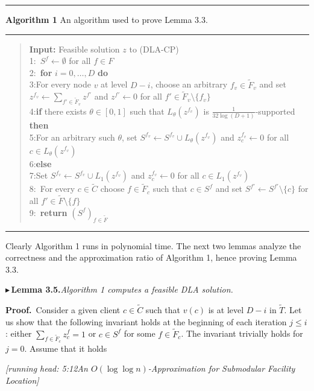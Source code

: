 \documentclass[11pt]{article}
\newcommand{\tF}{\tilde F}
\newcommand{\tC}{\tilde C}
\newcommand{\tT}{\tilde T}
\newcommand{\pitem}[2]{\par\medskip\noindent$\blacktriangleright$\,\textbf{#1}\;\textit{#2}\par\medskip}
\begin{document}
\bigskip
\noindent\rule{\textwidth}{0.4pt}
\noindent\textbf{Algorithm 1} An algorithm used to prove Lemma 3.3.
\noindent\rule{\textwidth}{0.4pt}
\begin{quote}
\textbf{Input:} Feasible solution $z$ to (DLA-CP)\\
1:\ $S^f\leftarrow\emptyset$ for all $f\in F$\\
2:\ \textbf{for} $i=0,\dots,D$ \textbf{do}\\
3:\quad For every node $v$ at level $D-i$, choose an arbitrary $f_v\in\tF_v$ and set $z^{f_v}\leftarrow\sum_{f'\in\tF_v}z^{f'}$ and
$z^{f'}\leftarrow 0$ for all $f'\in\tF_v\setminus\{f_v\}$\\
4:\quad \textbf{if} there exists $\theta\in[0,1]$ such that $L_\theta(z^{f_v})$ is $\frac{1}{32\log(D+1)}$-supported \textbf{then}\\
5:\quad\quad For an arbitrary such $\theta$, set $S^{f_v}\leftarrow S^{f_v}\cup L_\theta(z^{f_v})$ and $z_c^{f_v}\leftarrow 0$ for all $c\in L_\theta(z^{f_v})$\\
6:\quad \textbf{else}\\
7:\quad\quad Set $S^{f_v}\leftarrow S^{f_v}\cup L_1(z^{f_v})$ and $z_c^{f_v}\leftarrow 0$ for all $c\in L_1(z^{f_v})$\\
8:\ For every $c\in\tC$ choose $f\in\tF_c$ such that $c\in S^f$ and set $S^{f'}\leftarrow S^{f'}\setminus\{c\}$ for all $f'\in\tF\setminus\{f\}$\\
9:\ \textbf{return} $(S^f)_{f\in\tF}$
\end{quote}
\noindent\rule{\textwidth}{0.4pt}
\bigskip

Clearly Algorithm 1 runs in polynomial time. The next two lemmas analyze the correctness
and the approximation ratio of Algorithm 1, hence proving Lemma 3.3.

\pitem{Lemma 3.5.}{Algorithm 1 computes a feasible DLA solution.}

\noindent\textbf{Proof.}\ Consider a given client $c\in\tC$ such that $v(c)$ is at level $D-i$ in $\tT$. Let us show that
the following invariant holds at the beginning of each iteration $j\le i$: either $\sum_{f\in\tF_c}z_c^f=1$
or $c\in S^f$ for some $f\in\tF_c$. The invariant trivially holds for $j=0$. Assume that it holds

\noindent\textit{\small [running head: 5:12\hfill An $O(\log\log n)$-Approximation for Submodular Facility Location]}
\end{document}
